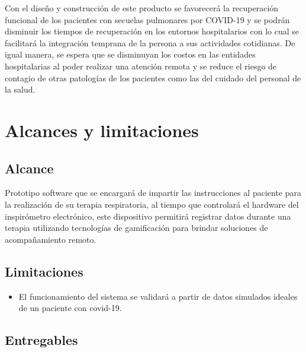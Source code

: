Con el dise\~{n}o y construcci\'on de este producto se favorecer\'a la recuperaci\'on funcional de los pacientes con secuelas pulmonares por COVID-19 y se podr\'an disminuir los tiempos de recuperaci\'on en los entornos hospitalarios con lo cual se facilitar\'a la integraci\'on temprana de la persona a sus actividades cotidianas. De igual manera, se espera que se disminuyan los costos en las entidades hospitalarias al poder realizar una atenci\'on remota y se reduce el riesgo de contagio de otras patolog\'ias de los pacientes como las del cuidado del personal de la salud.





\section{Alcances y limitaciones}

\subsection{Alcance} %

Prototipo software que se encargar\'a de impartir las instrucciones al paciente para la realizaci\'on de su terapia respiratoria, al tiempo que controlar\'a el hardware del inspir\'ometro electr\'onico, este dispositivo permitir\'a registrar datos durante una terapia utilizando tecnolog\'ias de gamificaci\'on para brindar soluciones de acompa\~{n}amiento remoto. 




\subsection{Limitaciones}

\begin{itemize}

\item El funcionamiento del sistema se validar\'a a partir de datos simulados ideales de un paciente con covid-19.

\end{itemize}

\subsection{Entregables}


